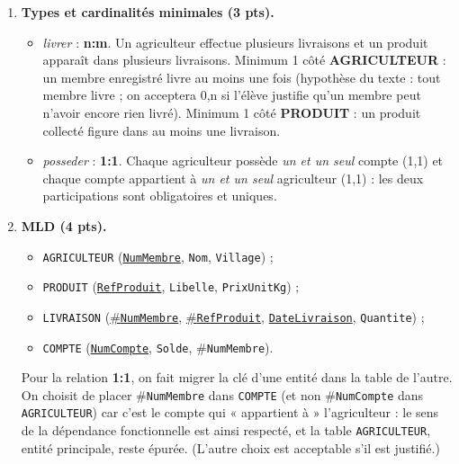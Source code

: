 \documentclass[11pt]{article}
\newcommand{\legende}[1]{\par\vspace{6pt}{\popsemi\fontsize{9}{11.5}\selectfont\color{popmuted}#1}}
\begin{document}
\begin{corrige}
\begin{enumerate}
\begin{popfigure}
\legende{MCD de la coopérative COOPAGRO}
\end{popfigure}
  Normalisation respectée : noms d'entités au singulier en majuscules, identifiants simples (\texttt{NumMembre}, \texttt{RefProduit}, \texttt{NumCompte}), aucun attribut composé, aucune association fantôme.
  \item \textbf{Types et cardinalités minimales (3 pts).}
  \begin{itemize}
    \item \emph{livrer} : \textbf{n:m}. Un agriculteur effectue plusieurs livraisons et un produit apparaît dans plusieurs livraisons. Minimum 1 côté \textbf{AGRICULTEUR} : un membre enregistré livre au moins une fois (hypothèse du texte : tout membre livre ; on acceptera 0,n si l'élève justifie qu'un membre peut n'avoir encore rien livré). Minimum 1 côté \textbf{PRODUIT} : un produit collecté figure dans au moins une livraison.
    \item \emph{posseder} : \textbf{1:1}. Chaque agriculteur possède \emph{un et un seul} compte (1,1) et chaque compte appartient à \emph{un et un seul} agriculteur (1,1) : les deux participations sont obligatoires et uniques.
  \end{itemize}
  \item \textbf{MLD (4 pts).}
  \begin{itemize}
    \item \texttt{AGRICULTEUR} (\underline{\texttt{NumMembre}}, \texttt{Nom}, \texttt{Village}) ;
    \item \texttt{PRODUIT} (\underline{\texttt{RefProduit}}, \texttt{Libelle}, \texttt{PrixUnitKg}) ;
    \item \texttt{LIVRAISON} (\underline{\#\texttt{NumMembre}}, \underline{\#\texttt{RefProduit}}, \underline{\texttt{DateLivraison}}, \texttt{Quantite}) ;
    \item \texttt{COMPTE} (\underline{\texttt{NumCompte}}, \texttt{Solde}, \#\texttt{NumMembre}).
  \end{itemize}
  Pour la relation \textbf{1:1}, on fait migrer la clé d'une entité dans la table de l'autre. On choisit de placer \#\texttt{NumMembre} dans \texttt{COMPTE} (et non \#\texttt{NumCompte} dans \texttt{AGRICULTEUR}) car c'est le compte qui « appartient à » l'agriculteur : le sens de la dépendance fonctionnelle est ainsi respecté, et la table \texttt{AGRICULTEUR}, entité principale, reste épurée. (L'autre choix est acceptable s'il est justifié.)

\end{enumerate}
\end{corrige}
\end{document}
